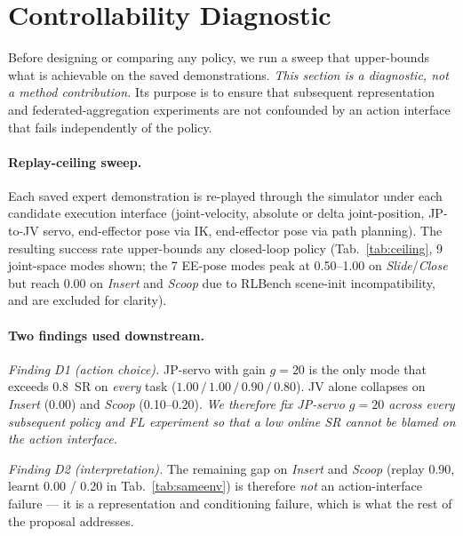 \documentclass{article}
\begin{document}
\section{Controllability Diagnostic}
\label{sec:diagnostic}

Before designing or comparing any policy, we run a sweep that
upper-bounds what is achievable on the saved demonstrations.
\emph{This section is a diagnostic, not a method contribution.}
Its purpose is to ensure that subsequent representation and
federated-aggregation experiments are not confounded by an
action interface that fails independently of the policy.

\paragraph{Replay-ceiling sweep.}
Each saved expert demonstration is re-played through the simulator
under each candidate execution interface (joint-velocity, absolute
or delta joint-position, JP-to-JV servo, end-effector pose via IK,
end-effector pose via path planning). The resulting success rate
upper-bounds any closed-loop policy
(Tab.~\ref{tab:ceiling}, 9 joint-space modes shown; the 7 EE-pose
modes peak at 0.50--1.00 on \emph{Slide}/\emph{Close} but reach
0.00 on \emph{Insert} and \emph{Scoop} due to RLBench scene-init
incompatibility, and are excluded for clarity).

\paragraph{Two findings used downstream.}

\noindent\emph{Finding D1 (action choice).}
JP-servo with gain $g\!=\!20$ is the only mode that exceeds
$0.8$~SR on \emph{every} task ($1.00\,/\,1.00\,/\,0.90\,/\,0.80$).
JV alone collapses on \emph{Insert} (0.00) and \emph{Scoop}
(0.10--0.20). \emph{We therefore fix JP-servo $g\!=\!20$ across
every subsequent policy and FL experiment so that a low online SR
cannot be blamed on the action interface.}

\noindent\emph{Finding D2 (interpretation).}
The remaining gap on \emph{Insert} and \emph{Scoop} (replay 0.90,
learnt 0.00 / 0.20 in Tab.~\ref{tab:sameenv}) is therefore
\emph{not} an action-interface failure --- it is a representation
and conditioning failure, which is what the rest of the proposal
addresses.
\end{document}
